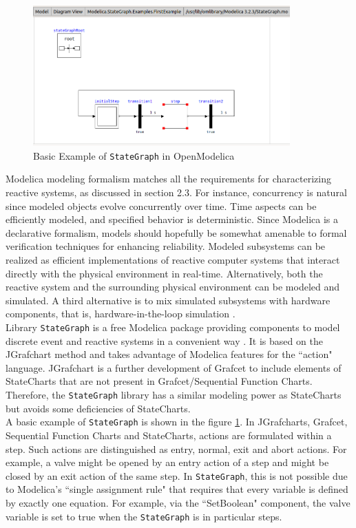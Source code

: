 \documentclass[12pt]{report}
\begin{document}
\begin{figure}[h]
\centering
\includegraphics[width=0.88\textwidth]{images/stategraph.png}
\caption{Basic Example of \texttt{StateGraph} in OpenModelica}
\label{fig:stategraph}
\end{figure}

Modelica modeling formalism matches all the requirements for characterizing reactive systems, as discussed in section 2.3. For instance, concurrency is natural since modeled objects evolve concurrently over time. Time aspects can be efficiently modeled, and specified behavior is deterministic. Since Modelica is a declarative formalism, models should hopefully be somewhat amenable to formal verification techniques for enhancing reliability. Modeled subsystems can be realized as efficient implementations of reactive computer systems that interact directly with the physical environment in real-time. Alternatively, both the reactive system and the surrounding physical environment can be modeled and simulated. A third alternative is to mix simulated subsystems with hardware components, that is, hardware-in-the-loop simulation \cite{hil}.\\ 

Library \texttt{StateGraph} is a free Modelica package providing components to model discrete event and reactive systems in a convenient way \cite{stategraph}. It is based on the JGrafchart method and takes advantage of Modelica features for the ``action" language. JGrafchart is a further development of Grafcet to include elements of StateCharts that are not present in Grafcet/Sequential Function Charts. Therefore, the \texttt{StateGraph} library has a similar modeling power as StateCharts but avoids some deficiencies of StateCharts. \\

A basic example of \texttt{StateGraph} is shown in the figure \ref{fig:stategraph}. In JGrafcharts, Grafcet, Sequential Function Charts and StateCharts, actions are formulated within a step. Such actions are distinguished as entry, normal, exit and abort actions. For example, a valve might be opened by an entry action of a step and might be closed by an exit action of the same step. In \texttt{StateGraph}, this is not possible due to Modelica's ``single assignment rule" that requires that every variable is defined by exactly one equation. For example, via the ``SetBoolean" component, the valve variable is set to true when the \texttt{StateGraph} is in particular steps. \\ 
\end{document}
